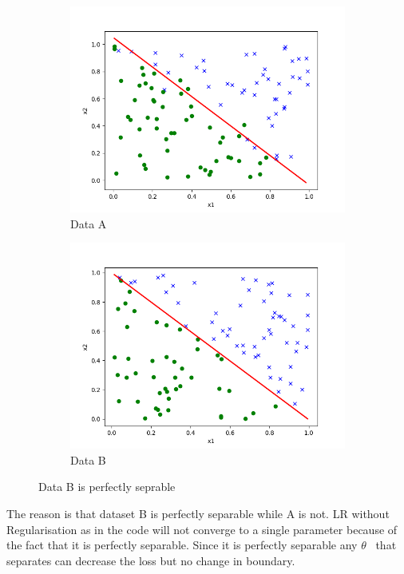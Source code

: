 \begin{answer}
\begin{figure}[h!]
\centering
\begin{subfigure}{.5\textwidth}
  \centering
  \includegraphics[width=.75\linewidth]{stability/0.png}
  \caption{Data A}
  \label{fig:sub1}
\end{subfigure}%
\begin{subfigure}{.5\textwidth}
  \centering
  \includegraphics[width=.75\linewidth]{stability/1.png}
  \caption{Data B}
  \label{fig:sub2}
\end{subfigure}
\caption{Data B is perfectly seprable}
\label{fig:test}
\end{figure}

The reason is that dataset B is perfectly separable while A is not. LR without Regularisation as in the code will not converge to a single parameter because of the fact that it is perfectly separable. Since it is perfectly separable any $\theta$ \ that separates can decrease the loss but no change in boundary.
\\ \\

\end{answer}

